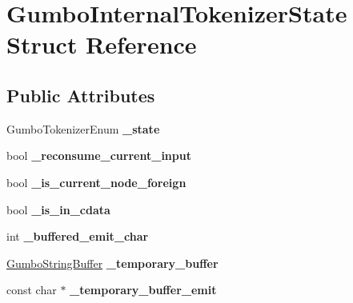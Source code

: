 \hypertarget{struct_gumbo_internal_tokenizer_state}{}\section{Gumbo\+Internal\+Tokenizer\+State Struct Reference}
\label{struct_gumbo_internal_tokenizer_state}
\subsection*{Public Attributes}
\begin{DoxyCompactItemize}
\item 
\mbox{\label{struct_gumbo_internal_tokenizer_state_ab724e1b67454dbcfd712ad0889eded08}} 
Gumbo\+Tokenizer\+Enum {\bfseries \+\_\+state}
\item 
\mbox{\label{struct_gumbo_internal_tokenizer_state_a30f2af08129cd3bfe188fd2fe58bd08b}} 
bool {\bfseries \+\_\+reconsume\+\_\+current\+\_\+input}
\item 
\mbox{\label{struct_gumbo_internal_tokenizer_state_ac730a5a2730d698c551233400560572a}} 
bool {\bfseries \+\_\+is\+\_\+current\+\_\+node\+\_\+foreign}
\item 
\mbox{\label{struct_gumbo_internal_tokenizer_state_a7523276f453783fed20a196530824003}} 
bool {\bfseries \+\_\+is\+\_\+in\+\_\+cdata}
\item 
\mbox{\label{struct_gumbo_internal_tokenizer_state_a8eb3b286aa3c374a06c69225909aed1d}} 
int {\bfseries \+\_\+buffered\+\_\+emit\+\_\+char}
\item 
\mbox{\label{struct_gumbo_internal_tokenizer_state_a5c74dea5733759d99400186f5272d6b5}} 
\mbox{\hyperlink{struct_gumbo_string_buffer}{Gumbo\+String\+Buffer}} {\bfseries \+\_\+temporary\+\_\+buffer}
\item 
\mbox{\label{struct_gumbo_internal_tokenizer_state_a6740e0fe6e40b68a7dd06fc464264796}} 
const char $\ast$ {\bfseries \+\_\+temporary\+\_\+buffer\+\_\+emit}

\end{DoxyCompactItemize}
